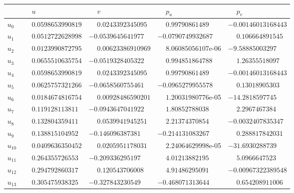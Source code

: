 \documentclass[1p]{article}
\begin{document}
\begin{table}[H]
    \scriptsize
    \centering
    \begin{tabular}{lllll}
        \hline
         & $\phantom{-}u$ & $\phantom{-}v$ & $\phantom{-}p_u$ & $\phantom{-}p_v$ \\
        \hline
        $\hat{u}_{0}$ & $\phantom{-}0.0598653990819$ & $\phantom{-}0.0243392345095$ & $\phantom{-}0.99790861489$ & $-0.00146013168443$ \\
        $\hat{u}_{1}$ & $\phantom{-}0.0512722628998$ & $-0.0539645641977$ & $-0.0790749932687$ & $\phantom{-}0.106664891545$ \\
        $\hat{u}_{2}$ & $\phantom{-}0.0123990872795$ & $\phantom{-}0.00623386910969$ & $\phantom{-}8.06085056107$e-06 & $-9.58885003297$ \\
        $\hat{u}_{3}$ & $\phantom{-}0.0655510635754$ & $-0.0519328405322$ & $\phantom{-}0.994851864788$ & $\phantom{-}1.26355518097$ \\
        $\hat{u}_{4}$ & $\phantom{-}0.0598653990819$ & $\phantom{-}0.0243392345095$ & $\phantom{-}0.99790861489$ & $-0.00146013168443$ \\
        $\hat{u}_{5}$ & $\phantom{-}0.0625757321266$ & $-0.0658560755461$ & $-0.0965279955578$ & $\phantom{-}0.13018905303$ \\
        $\hat{u}_{6}$ & $\phantom{-}0.0184674816754$ & $\phantom{-}0.00928486590201$ & $\phantom{-}1.20031980776$e-05 & $-14.2818597745$ \\
        $\hat{u}_{7}$ & $\phantom{-}0.119128113811$ & $-0.0943647041922$ & $\phantom{-}1.80852788038$ & $\phantom{-}2.2967467384$ \\
        $\hat{u}_{8}$ & $\phantom{-}0.132804359411$ & $\phantom{-}0.0539941945251$ & $\phantom{-}2.21374370854$ & $-0.0032407835347$ \\
        $\hat{u}_{9}$ & $\phantom{-}0.138815104952$ & $-0.146096387381$ & $-0.214131083267$ & $\phantom{-}0.288817842031$ \\
        $\hat{u}_{10}$ & $\phantom{-}0.0409636350452$ & $\phantom{-}0.0205951178031$ & $\phantom{-}2.24064629998$e-05 & $-31.6930288739$ \\
        $\hat{u}_{11}$ & $\phantom{-}0.264355726553$ & $-0.209336295197$ & $\phantom{-}4.01213882195$ & $\phantom{-}5.0966647523$ \\
        $\hat{u}_{12}$ & $\phantom{-}0.294792860317$ & $\phantom{-}0.120543706008$ & $\phantom{-}4.91486295091$ & $-0.00967322389548$ \\
        $\hat{u}_{13}$ & $\phantom{-}0.305475938325$ & $-0.327843230549$ & $-0.468071313644$ & $\phantom{-}0.654208911006$ \\

\end{tabular}
\end{table}
\end{document}
